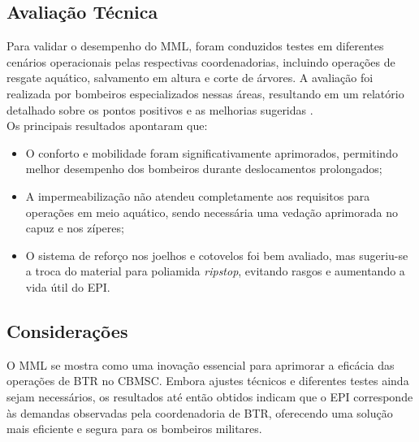
\subsection{Avaliação Técnica}

Para validar o desempenho do \acrlong{MML}, foram conduzidos testes em diferentes cenários operacionais pelas respectivas coordenadorias, incluindo operações de resgate aquático, salvamento em altura e corte de árvores. A avaliação foi realizada por bombeiros especializados nessas áreas, resultando em um relatório detalhado sobre os pontos positivos e as melhorias sugeridas \cite{relMML}.
\\
Os principais resultados apontaram que:
\begin{itemize}
    \item O conforto e mobilidade foram significativamente aprimorados, permitindo melhor desempenho dos bombeiros durante deslocamentos prolongados;
    \item A impermeabilização não atendeu completamente aos requisitos para operações em meio aquático, sendo necessária uma vedação aprimorada no capuz e nos zíperes;
    \item O sistema de reforço nos joelhos e cotovelos foi bem avaliado, mas sugeriu-se a troca do material para poliamida \textit{ripstop}, evitando rasgos e aumentando a vida útil do \acrshort{EPI}.
\end{itemize}

    

\subsection{Considerações}
O \acrlong{MML} se mostra como uma inovação essencial para aprimorar a eficácia das operações de \acrlong{BTR} no \acrshort{CBMSC}. Embora ajustes técnicos e diferentes testes ainda sejam necessários, os resultados até então obtidos indicam que o \acrshort{EPI} corresponde às demandas observadas pela coordenadoria de \acrshort{BTR}, oferecendo uma solução mais eficiente e segura para os bombeiros militares.